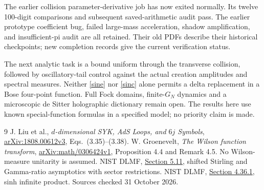 \documentclass[11pt,a4paper]{article}
\begin{document}
The earlier collision parameter-derivative job has now exited normally.
Its twelve 100-digit comparisons and subsequent saved-arithmetic audit
pass. The earlier prototype coefficient bug, failed large-mass
acceleration, shadow amplification, and insufficient-pi audit are all
retained. Their old PDFs describe their historical checkpoints;
new completion records give the current verification status.

The next analytic task is a bound uniform through the transverse
collision, followed by oscillatory-tail control against the actual
creation amplitudes and spectral measures. Neither \eqref{sine} nor
\eqref{sinc} alone permits a delta replacement in a Bose four-point
function. Full Fock domains, finite-$G_N$ dynamics and a microscopic
de Sitter holographic dictionary remain open. The results here use
known special-function formulas in a specified model; no priority
claim is made.

\begin{thebibliography}{9}
 J. Liu et al., \emph{$d$-dimensional SYK, AdS Loops, and
$6j$ Symbols}, \href{https://arxiv.org/html/1808.00612v3}{arXiv:1808.00612v3},
Eqs.\ (3.35)--(3.38).
 W. Groenevelt, \emph{The Wilson function transform},
\href{https://arxiv.org/html/math/0306424v1}{arXiv:math/0306424v1},
Proposition 4.4 and Remark 4.5. No Wilson-measure unitarity is assumed.
 NIST DLMF,
\href{https://dlmf.nist.gov/5.11}{Section 5.11}, shifted Stirling and
Gamma-ratio asymptotics with sector restrictions.
 NIST DLMF,
\href{https://dlmf.nist.gov/4.36}{Section 4.36.1}, sinh infinite product.
Sources checked 31 October 2026.
\end{thebibliography}
\end{document}
